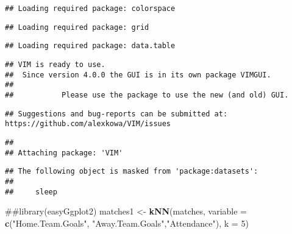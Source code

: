 \documentclass[]{article}
\newenvironment{Shaded}{\begin{snugshade}}{\end{snugshade}}
\newcommand{\KeywordTok}[1]{\textcolor[rgb]{0.13,0.29,0.53}{\textbf{#1}}}
\newcommand{\DataTypeTok}[1]{\textcolor[rgb]{0.13,0.29,0.53}{#1}}
\newcommand{\DecValTok}[1]{\textcolor[rgb]{0.00,0.00,0.81}{#1}}
\newcommand{\StringTok}[1]{\textcolor[rgb]{0.31,0.60,0.02}{#1}}
\newcommand{\NormalTok}[1]{#1}
\begin{document}
\begin{verbatim}
## Loading required package: colorspace
\end{verbatim}

\begin{verbatim}
## Loading required package: grid
\end{verbatim}

\begin{verbatim}
## Loading required package: data.table
\end{verbatim}

\begin{verbatim}
## VIM is ready to use. 
##  Since version 4.0.0 the GUI is in its own package VIMGUI.
## 
##           Please use the package to use the new (and old) GUI.
\end{verbatim}

\begin{verbatim}
## Suggestions and bug-reports can be submitted at: https://github.com/alexkowa/VIM/issues
\end{verbatim}

\begin{verbatim}
## 
## Attaching package: 'VIM'
\end{verbatim}

\begin{verbatim}
## The following object is masked from 'package:datasets':
## 
##     sleep
\end{verbatim}

\begin{Shaded}
\begin{Highlighting}[]
\NormalTok{##library(easyGgplot2)}
\NormalTok{matches1 <-}\StringTok{ }\KeywordTok{kNN}\NormalTok{(matches, }\DataTypeTok{variable =} \KeywordTok{c}\NormalTok{(}\StringTok{"Home.Team.Goals"}\NormalTok{, }\StringTok{"Away.Team.Goals"}\NormalTok{,}\StringTok{"Attendance"}\NormalTok{), }\DataTypeTok{k =} \DecValTok{5}\NormalTok{)}
\end{Highlighting}
\end{Shaded}
\end{document}
